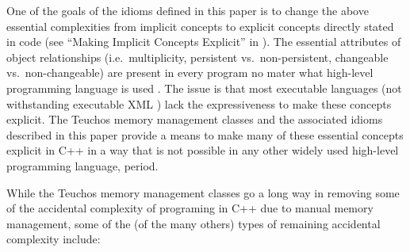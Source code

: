 \documentclass[pdf,ps2pdf,11pt]{SANDreport}
\begin{document}
One of the goals of the idioms defined in this paper is to change the
above essential complexities from implicit concepts to explicit
concepts directly stated in code (see ``Making Implicit Concepts
Explicit'' in {}\cite[Chapter 9]{DomainDrivenDesign}).  The essential
attributes of object relationships (i.e.\ multiplicity, persistent
vs.\ non-persistent, changeable vs.\ non-changeable) are present in
every program no mater what high-level programming language is used
{}\cite{MythicalManMonth95, CodeComplete2nd04,
WorkingEffectivelyWithLegacyCode05}.  The issue is that most
executable languages (not withstanding executable XML {}\cite[Chapter
1]{UMLDistilledThirdEdition04}) lack the expressiveness to make these
concepts explicit.  The Teuchos memory management classes and the
associated idioms described in this paper provide a means to make many
of these essential concepts explicit in C++ in a way that is not
possible in any other widely used high-level programming language,
period.  

While the Teuchos memory management classes go a long way in
removing some of the accidental complexity of programing in C++ due to
manual memory management, some of the (of the many others) types of
remaining accidental complexity include:
\end{document}
